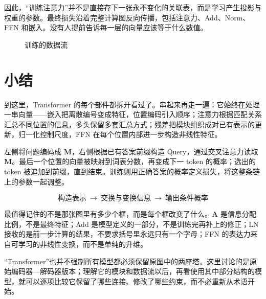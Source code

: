\documentclass[UTF8,a4paper,12pt]{ctexart}
\numberwithin{equation}{section}
\begin{document}
因此，``训练注意力''并不是直接存下一张永不变化的关联表，而是学习产生投影与权重的参数。最终损失沿着完整计算图反向传播，包括注意力、Add、Norm、FFN 和嵌入。没有人提前告诉每一层的向量应该等于什么数值。

\begin{figure}[htbp]
\centering
{}
\caption{训练的数据流}
\label{fig:training}
\end{figure}

\section{小结}

到这里，Transformer 的每个部件都拆开看过了。串起来再走一遍：它始终在处理一串向量——嵌入把离散编号变成特征，位置编码引入顺序；注意力根据匹配关系汇总不同位置的信息，多头保留多套汇总方式；残差把模块组织成对已有表示的更新，归一化控制尺度，FFN 在每个位置内部进一步构造非线性特征。

左侧将问题编码成 $\bm M$，右侧根据已有答案前缀构造 Query，通过交叉注意力读取 $\bm M$。最后一个位置的向量被映射到词表分数，再变成下一 token 的概率；选出的 token 被追加到前缀，直到结束。训练则用正确答案的概率定义损失，将这整条链上的参数一起调整。

\begin{equation}
\boxed{\text{构造表示}\ \longrightarrow\ \text{交换与变换信息}\
\longrightarrow\ \text{输出条件概率}}
\label{eq:summary}
\end{equation}

最值得记住的不是那张图里有多少个框，而是每个框改变了什么。$\bm A$ 是信息分配比例，不是最终特征；Add 是模型定义的一部分，不是训练完再补上的修正；LN 接收的是前一步计算的结果，不要求括号里永远只有一个字母；FFN 的表达力来自可学习的非线性变换，而不是单纯的升维。

\enlargethispage{20pt}

``Transformer''也并不强制所有模型都必须保留原图中的两座塔。这里讨论的是原始编码器—解码器版本；理解它的模块和数据流以后，再看使用其中部分结构的模型，就可以逐项比较它保留了哪些连接、修改了哪些约束，而不必重新从术语开始。
\end{document}
